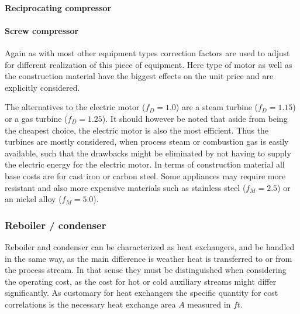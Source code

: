 			\paragraph{Reciprocating compressor}
				
			\paragraph{Screw compressor}
		
		Again as with most other equipment types correction factors are used to adjust for different realization
		of this piece of equipment. Here type of motor as well as the construction material have the biggest
		effects on the unit price and are explicitly considered.
		
		The alternatives to the electric motor ($f_D = 1.0$) are a steam turbine ($f_D = 1.15$) or a gas turbine
		($f_D = 1.25$). It should however be noted that aside from being the cheapest choice, the electric motor
		is also the most efficient. Thus the turbines are mostly considered, when process steam or combustion gas
		is easily available, such that the drawbacks might be eliminated by not having to supply the electric
		energy for the electric motor. In terms of construction material all base costs are for cast iron or
		carbon steel. Some appliances may require more resistant and also more expensive materials such as
		stainless steel ($f_M = 2.5$) or an nickel alloy ($f_M = 5.0$).
		
	\subsubsection{Reboiler / condenser}
		Reboiler and condenser can be characterized as heat exchangers, and be handled in the same way,
		as the main difference is weather heat is transferred to or from the process stream. In that sense
		they must be distinguished when considering the operating cost, as the cost for hot or cold
		auxiliary streams might differ significantly. As customary for heat exchangers the specific
		quantity for cost correlations is the necessary heat exchange area $A$ measured in $ft$.
		
